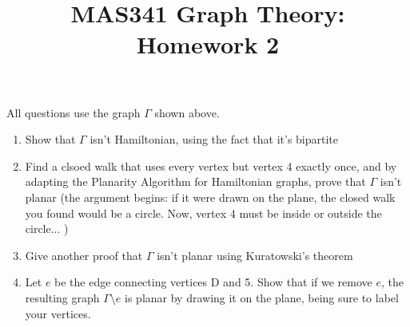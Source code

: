 \documentclass{article}
\date{}
\title{MAS341 Graph Theory: Homework 2}
\begin{document}
\maketitle
{}

All questions use the graph $\Gamma$ shown above.

\begin{enumerate}
\item Show that $\Gamma$ isn't Hamiltonian, using the fact that it's bipartite
\item Find a clsoed walk that uses every vertex but vertex 4 exactly once, and by adapting the Planarity Algorithm for Hamiltonian graphs, prove that $\Gamma$ isn't planar (the argument begins: if it were drawn on the plane, the closed walk you found would be a circle.  Now, vertex 4 must be inside or outside the circle... )
\item Give another proof that $\Gamma$ isn't planar using Kuratowski's theorem
\item Let $e$ be the edge connecting vertices D and 5.  Show that if we remove $e$, the resulting graph $\Gamma\setminus e$ is planar by drawing it on the plane, being sure to label your vertices.
\end{enumerate}
  
\end{document}
